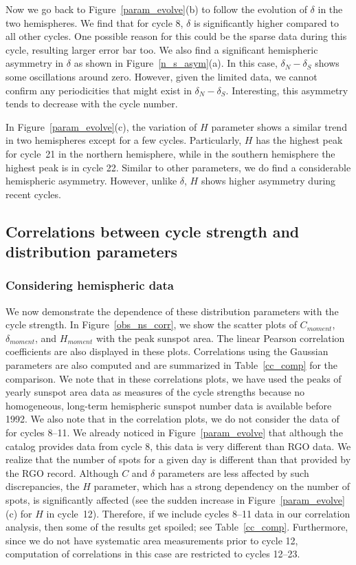 \documentclass[preprint2,times,tighten]{aastex61}
\newcommand{\Fig}[1]{Figure~\ref{#1}}
\begin{document}
Now we go back to \Fig{param_evolve}(b) to follow the evolution of $\delta$ in the two hemispheres. 
We find that for cycle 8, $\delta$ is significantly higher compared to all other cycles.
One possible reason for this could be the sparse data during this cycle, resulting larger error bar too. 
We also find a significant hemispheric asymmetry in $\delta$ as shown in \Fig{n_s_asym}(a). 
In this case, $\delta _{N}-\delta _{S}$ shows some oscillations around zero.
However, given the limited data, we cannot confirm any periodicities that might exist in $\delta _{N}-\delta _{S}$. 
Interesting, this asymmetry tends to decrease with the cycle number.

In \Fig{param_evolve}(c), the variation of $H$ parameter shows a similar trend in two hemispheres except for a few cycles. 
Particularly, $H$ has the highest peak for cycle~21 in the northern hemisphere, while in the southern hemisphere the highest peak is in cycle 22.
Similar to other parameters, we do find a considerable hemispheric asymmetry. However, unlike $\delta$, $H$ shows higher asymmetry
during recent cycles.


\subsection{Correlations between cycle strength and distribution parameters}
\subsubsection{Considering hemispheric data}
We now demonstrate the dependence of these distribution parameters with the cycle strength. 
In \Fig{obs_ns_corr}, we show the scatter plots of $C_{moment}$, $\delta_{moment}$, and $H_{moment}$ with the peak sunspot area.
The linear Pearson correlation coefficients are also displayed in these plots. 
Correlations using the Gaussian parameters are also computed and are 
summarized in Table~\ref{cc_comp} for the comparison.
We note that in these correlations plots, we have used the peaks of yearly sunspot area data as measures of the cycle strengths 
because no homogeneous, long-term hemispheric sunspot number data is available before 1992. 
We also note that in the correlation plots, we do not consider the data of  \citet{2017A&A...599A.131L} for cycles 8--11.
We already noticed in \Fig{param_evolve} that although the \citet{2017A&A...599A.131L} catalog 
provides data from cycle 8, this data is very different than RGO data. We realize that 
the number of spots for a given day is different than that provided by the RGO record.
Although $C$ and $\delta$ parameters are less affected by such discrepancies, the 
$H$ parameter, which has a strong dependency on the number of spots, is significantly affected 
(see the sudden increase in \Fig{param_evolve}(c) for $H$ in cycle~12). Therefore, if we include cycles 8--11 data 
in our correlation analysis, then some of the results get spoiled; see Table~\ref{cc_comp}. 
Furthermore, since we do not have systematic area measurements prior to cycle 12, computation of correlations in this case are restricted to cycles 12--23. 
\end{document}
